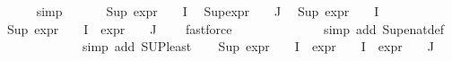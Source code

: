 \begin{isabellebody}
\ \ \ \ \isamarkupfalse%
\ simp\isanewline
\ \ \isamarkupfalse%
\ {}\ \isamarkupfalse%
\ {\isachardoublequoteopen}Sup\ {\isacharparenleft}{\kern0pt}{\isacharparenleft}{\kern0pt}expr{\isacharunderscore}{\kern0pt}{}\ {\isasymcirc}\ {\isasymPhi}{\isacharparenright}{\kern0pt}\ {\isacharbackquote}{\kern0pt}\ I{\isacharparenright}{\kern0pt}\ {\isasymle}\ {}{\isachardoublequoteclose}\isanewline
{\isachardoublequoteopen}Sup{\isacharparenleft}{\kern0pt}{\isacharparenleft}{\kern0pt}expr{\isacharunderscore}{\kern0pt}{}\ {\isasymcirc}\ {\isasymPhi}{\isacharparenright}{\kern0pt}\ {\isacharbackquote}{\kern0pt}\ J{\isacharparenright}{\kern0pt}\ {\isasymle}\ {}{\isachardoublequoteclose}\isanewline
{\isachardoublequoteopen}Sup\ {\isacharparenleft}{\kern0pt}{\isacharparenleft}{\kern0pt}expr{\isacharunderscore}{\kern0pt}{}\ {\isasymcirc}\ {\isasymPhi}{\isacharparenright}{\kern0pt}\ {\isacharbackquote}{\kern0pt}\ I{\isacharparenright}{\kern0pt}\ {\isasymle}\ {}{\isachardoublequoteclose}\isanewline
\ \ \ \ \isanewline
\ \ \ \ \isamarkupfalse%
\ {\isacartoucheopen}Sup\ {\isacharparenleft}{\kern0pt}{\isacharparenleft}{\kern0pt}expr{\isacharunderscore}{\kern0pt}{}\ {\isasymcirc}\ {\isasymPhi}{\isacharparenright}{\kern0pt}\ {\isacharbackquote}{\kern0pt}\ I\ {\isasymunion}\ {\isacharparenleft}{\kern0pt}expr{\isacharunderscore}{\kern0pt}{}\ {\isasymcirc}\ {\isasymPhi}{\isacharparenright}{\kern0pt}\ {\isacharbackquote}{\kern0pt}\ J{\isacharparenright}{\kern0pt}\ {\isasymle}\ {}{\isacartoucheclose}\ \isamarkupfalse%
\ fastforce\isanewline
\ \ \ \ \isamarkupfalse%
\ {}\ \isanewline
\ \ \ \ \ \isamarkupfalse%
\ {\isacharparenleft}{\kern0pt}simp\ add{\isacharcolon}{\kern0pt}\ Sup{\isacharunderscore}{\kern0pt}enat{\isacharunderscore}{\kern0pt}def{\isacharparenright}{\kern0pt}\isanewline
\ \ \ \ \isamarkupfalse%
\ {}\ \isanewline
\ \ \ \ \isamarkupfalse%
\ {\isacharparenleft}{\kern0pt}simp\ add{\isacharcolon}{\kern0pt}\ SUP{\isacharunderscore}{\kern0pt}least{\isacharparenright}{\kern0pt}\isanewline
\ \ \isamarkupfalse%
\ {\isachardoublequoteopen}{\isacharparenleft}{\kern0pt}Sup\ {\isacharparenleft}{\kern0pt}{\isacharparenleft}{\kern0pt}expr{\isacharunderscore}{\kern0pt}{}\ {\isasymcirc}\ {\isasymPhi}{\isacharparenright}{\kern0pt}\ {\isacharbackquote}{\kern0pt}\ I\ {\isasymunion}\ {\isacharparenleft}{\kern0pt}expr{\isacharunderscore}{\kern0pt}{}\ {\isasymcirc}\ {\isasymPhi}{\isacharparenright}{\kern0pt}\ {\isacharbackquote}{\kern0pt}\ I\ {\isasymunion}\ {\isacharparenleft}{\kern0pt}expr{\isacharunderscore}{\kern0pt}{}\ {\isasymcirc}\ {\isasymPhi}{\isacharparenright}{\kern0pt}\ {\isacharbackquote}{\kern0pt}\ J{\isacharparenright}{\kern0pt}{\isacharparenright}{\kern0pt}\ {\isasymle}\ {}{\isachardoublequoteclose}\isanewline

\end{isabellebody}
